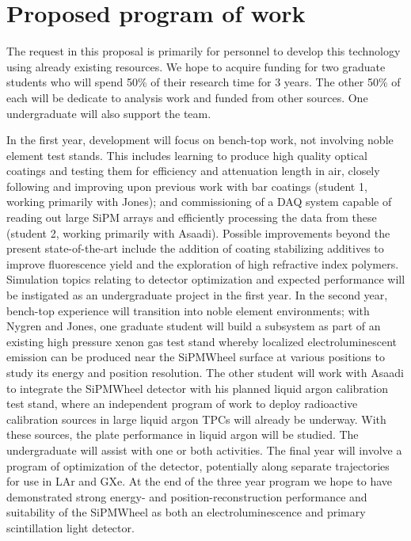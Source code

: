 \section{Proposed program of work}

The request in this proposal is primarily for personnel to develop this technology using already existing resources.  We hope to acquire funding for two graduate students who will spend 50\% of their research time for 3 years.  The other 50\% of each will be dedicate to analysis work and funded from other sources.   One undergraduate will also support the team.

In the first year, development will focus on bench-top work, not involving noble element test stands.   This includes learning to produce high quality optical coatings and testing them for efficiency and attenuation length in air, closely following and improving upon previous work with bar coatings (student 1, working primarily with Jones); and commissioning  of a DAQ system capable of reading out large SiPM arrays and efficiently processing the data from these (student 2, working primarily with Asaadi).  Possible improvements beyond the present state-of-the-art include the addition of coating stabilizing additives to improve fluorescence yield and the exploration of high refractive index polymers. Simulation topics relating to detector optimization and expected performance will be instigated as an undergraduate project in the first year.  In the second year, bench-top experience will transition into noble element environments;  with Nygren and Jones, one graduate student will build a subsystem as part of an existing high pressure xenon gas test stand whereby localized electroluminescent emission can be produced near the SiPMWheel surface at various positions to study its energy and position resolution.   The other student will work with Asaadi to integrate the SiPMWheel detector with his planned liquid argon calibration test stand, where an independent program of work to deploy radioactive calibration sources in large liquid argon TPCs will already be underway.  With these sources, the plate performance in liquid argon will be studied.  The undergraduate will assist with one or both activities.  The final year will involve a program of optimization of the detector, potentially along separate trajectories for use in LAr and GXe.  At the end of the three year program we hope to have demonstrated strong energy- and position-reconstruction performance and suitability of the SiPMWheel as both an electroluminescence and primary scintillation light detector.
